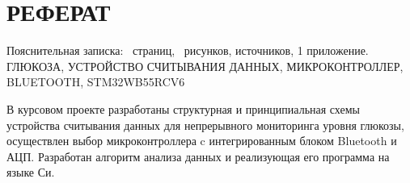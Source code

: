 \begin{sloppypar} %
\newpage %
\section*{РЕФЕРАТ} %

Пояснительная записка: \pageref*{LastPage}~страниц, \totfig~рисунков, источников, 1 приложение.\\

 
 
 
ГЛЮКОЗА, УСТРОЙСТВО СЧИТЫВАНИЯ ДАННЫХ, МИКРОКОНТРОЛЛЕР, BLUETOOTH, STM32WB55RCV6


В курсовом проекте разработаны структурная и принципиальная схемы устройства считывания данных для непрерывного мониторинга уровня глюкозы, осуществлен выбор микроконтроллера c интегрированным блоком Bluetooth и АЦП. Разработан алгоритм анализа данных и реализующая его программа на языке Си.


\end{sloppypar}
